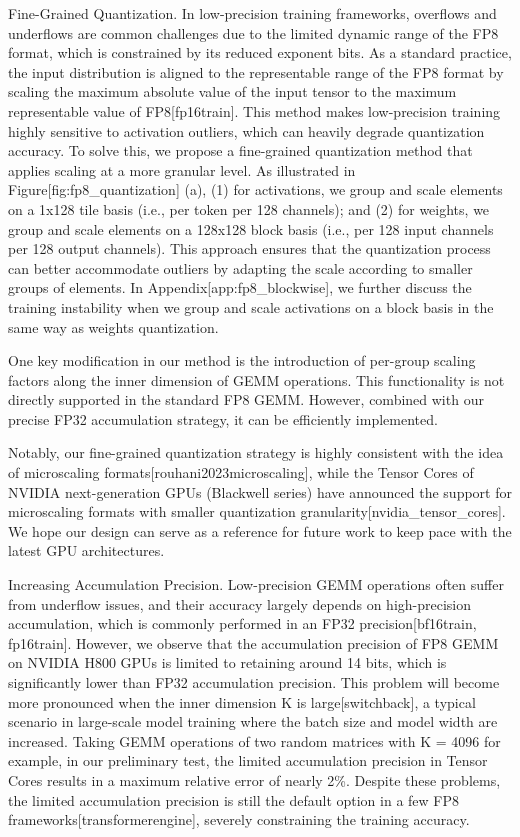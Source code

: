 \documentclass[11pt,a4paper]{article}
\begin{document}
Fine-Grained Quantization. In low-precision training frameworks, overflows and underflows are common challenges due to the limited dynamic range of the FP8 format, which is constrained by its reduced exponent bits. As a standard practice, the input distribution is aligned to the representable range of the FP8 format by scaling the maximum absolute value of the input tensor to the maximum representable value of FP8[fp16train]. This method makes low-precision training highly sensitive to activation outliers, which can heavily degrade quantization accuracy. To solve this, we propose a fine-grained quantization method that applies scaling at a more granular level. As illustrated in Figure[fig:fp8\_quantization] (a), (1) for activations, we group and scale elements on a 1x128 tile basis (i.e., per token per 128 channels); and (2) for weights, we group and scale elements on a 128x128 block basis (i.e., per 128 input channels per 128 output channels). This approach ensures that the quantization process can better accommodate outliers by adapting the scale according to smaller groups of elements. In Appendix[app:fp8\_blockwise], we further discuss the training instability when we group and scale activations on a block basis in the same way as weights quantization.

One key modification in our method is the introduction of per-group scaling factors along the inner dimension of GEMM operations. This functionality is not directly supported in the standard FP8 GEMM. However, combined with our precise FP32 accumulation strategy, it can be efficiently implemented.

Notably, our fine-grained quantization strategy is highly consistent with the idea of microscaling formats[rouhani2023microscaling], while the Tensor Cores of NVIDIA next-generation GPUs (Blackwell series) have announced the support for microscaling formats with smaller quantization granularity[nvidia\_tensor\_cores]. We hope our design can serve as a reference for future work to keep pace with the latest GPU architectures.

Increasing Accumulation Precision. Low-precision GEMM operations often suffer from underflow issues, and their accuracy largely depends on high-precision accumulation, which is commonly performed in an FP32 precision[bf16train, fp16train]. However, we observe that the accumulation precision of FP8 GEMM on NVIDIA H800 GPUs is limited to retaining around 14 bits, which is significantly lower than FP32 accumulation precision. This problem will become more pronounced when the inner dimension K is large[switchback], a typical scenario in large-scale model training where the batch size and model width are increased. Taking GEMM operations of two random matrices with K = 4096 for example, in our preliminary test, the limited accumulation precision in Tensor Cores results in a maximum relative error of nearly 2\%. Despite these problems, the limited accumulation precision is still the default option in a few FP8 frameworks[transformerengine], severely constraining the training accuracy.
\end{document}
